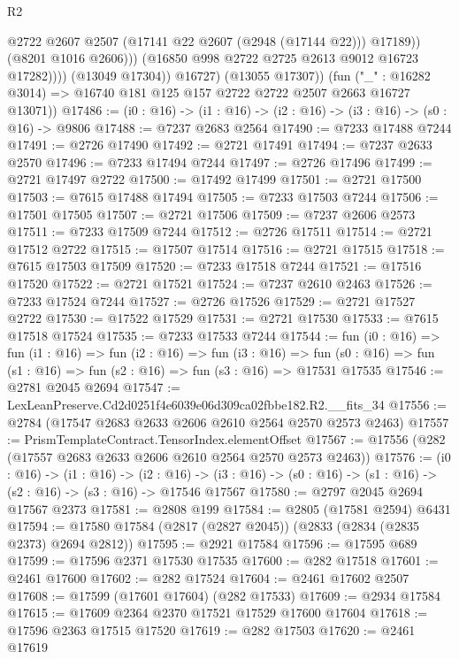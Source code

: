 \begin{lexlean}{R2}
\begin{coremodule}
                          @2722
                          @2607
                          @2507
                          (@17141 @22 @2607 (@2948 (@17144 @22)))
                          @17189))
                      (@8201 @1016 @2606)))
                  (@16850 @998 @2722 @2725 @2613 @9012 @16723 @17282))))
            (@13049 @17304))
          @16727)
        (@13055 @17307))
      (fun ("_" : @16282 @3014) => @16740 @181 @125 @157 @2722 @2722 @2507 @2663 @16727 @13071))
@17486 := (i0 : @16) -> (i1 : @16) -> (i2 : @16) -> (i3 : @16) -> (s0 : @16) -> @9806
@17488 := @7237 @2683 @2564
@17490 := @7233 @17488 @7244
@17491 := @2726 @17490
@17492 := @2721 @17491
@17494 := @7237 @2633 @2570
@17496 := @7233 @17494 @7244
@17497 := @2726 @17496
@17499 := @2721 @17497 @2722
@17500 := @17492 @17499
@17501 := @2721 @17500
@17503 := @7615 @17488 @17494
@17505 := @7233 @17503 @7244
@17506 := @17501 @17505
@17507 := @2721 @17506
@17509 := @7237 @2606 @2573
@17511 := @7233 @17509 @7244
@17512 := @2726 @17511
@17514 := @2721 @17512 @2722
@17515 := @17507 @17514
@17516 := @2721 @17515
@17518 := @7615 @17503 @17509
@17520 := @7233 @17518 @7244
@17521 := @17516 @17520
@17522 := @2721 @17521
@17524 := @7237 @2610 @2463
@17526 := @7233 @17524 @7244
@17527 := @2726 @17526
@17529 := @2721 @17527 @2722
@17530 := @17522 @17529
@17531 := @2721 @17530
@17533 := @7615 @17518 @17524
@17535 := @7233 @17533 @7244
@17544 := fun (i0 : @16) =>
  fun (i1 : @16) =>
  fun (i2 : @16) =>
  fun (i3 : @16) =>
  fun (s0 : @16) => fun (s1 : @16) => fun (s2 : @16) => fun (s3 : @16) => @17531 @17535
@17546 := @2781 @2045 @2694
@17547 := LexLeanPreserve.Cd2d0251f4e6039e06d309ca02fbbe182.R2.__fits_34
@17556 := @2784 (@17547 @2683 @2633 @2606 @2610 @2564 @2570 @2573 @2463)
@17557 := PrismTemplateContract.TensorIndex.elementOffset
@17567 := @17556 (@282 (@17557 @2683 @2633 @2606 @2610 @2564 @2570 @2573 @2463))
@17576 := (i0 : @16) ->
  (i1 : @16) ->
  (i2 : @16) -> (i3 : @16) -> (s0 : @16) -> (s1 : @16) -> (s2 : @16) -> (s3 : @16) -> @17546 @17567
@17580 := @2797 @2045 @2694 @17567 @2373
@17581 := @2808 @199
@17584 := @2805 (@17581 @2594) @6431
@17594 := @17580 @17584 (@2817 (@2827 @2045)) (@2833 (@2834 (@2835 @2373) @2694 @2812))
@17595 := @2921 @17584
@17596 := @17595 @689
@17599 := @17596 @2371 @17530 @17535
@17600 := @282 @17518
@17601 := @2461 @17600
@17602 := @282 @17524
@17604 := @2461 @17602 @2507
@17608 := @17599 (@17601 @17604) (@282 @17533)
@17609 := @2934 @17584
@17615 := @17609 @2364 @2370 @17521 @17529 @17600 @17604
@17618 := @17596 @2363 @17515 @17520
@17619 := @282 @17503
@17620 := @2461 @17619

\end{coremodule}
\end{lexlean}
